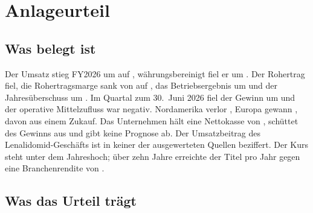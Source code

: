 \section{Anlageurteil}
\label{sec:urteil-rdy}

\subsection{Was belegt ist}

Der Umsatz stieg FY2026 um \Pct{\RdyUmsatzWachstum} auf
\MioINR{\RdyUmsatzXXVI}, w\"ahrungsbereinigt fiel er um
\PctBetrag{\RdyOrganisch}. Der Rohertrag fiel, die Rohertragsmarge sank von
\Pct{\RdyRohertragsmargeVJ} auf \Pct{\RdyRohertragsmarge}, das
Betriebsergebnis um \PctBetrag{\RdyBetriebsergebnisWachstum} und der
Jahres\"uberschuss um \PctBetrag{\RdyErgebnisWachstum}. Im Quartal zum
30.~Juni 2026 fiel der Gewinn um \PctBetrag{\RdyQuartalGewinnWachstum} und
der operative Mittelzufluss war negativ. Nordamerika verlor
\MioINR{\RdyNordamerikaRueckgang}, Europa gewann
\MioINR{\RdyEuropaZuwachs}, davon \MioINR{\RdyNrtUmsatz} aus einem Zukauf.
Das Unternehmen h\"alt eine Nettokasse von \MioINR{\RdyNettokasse}, sch\"uttet
\Pct{\RdyAusschuettungsquote} des Gewinns aus und gibt keine Prognose ab. Der
Umsatzbeitrag des Lenalidomid-Gesch\"afts ist in keiner der ausgewerteten
Quellen beziffert. Der Kurs steht \PctBetrag{\RdyAbstandHoch} unter dem
Jahreshoch; \"uber zehn Jahre erreichte der Titel \Pct{\RdyRenditeZehn} pro
Jahr gegen eine Branchenrendite von \Pct{\Huerde}.

\subsection{Was das Urteil tr\"agt}



